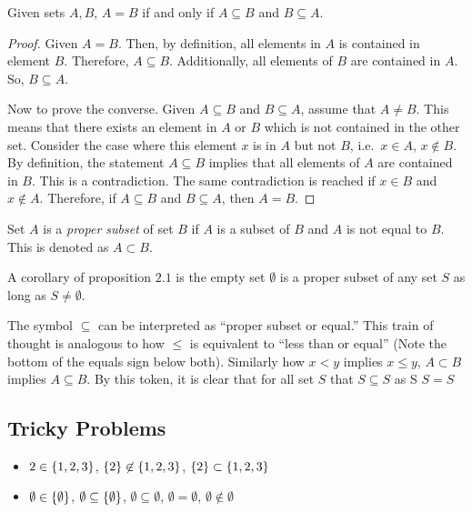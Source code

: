 \bigskip
\begin{proposition}
    Given sets \(A,B\), \(A=B\) if and only if \(A\subseteq B\) and \(B\subseteq A\).
\end{proposition}
\begin{proof}
    Given \(A=B\). Then, by definition, all elements in \(A\) is contained in element \(B\). Therefore, \(A\subseteq B\).
    Additionally, all elements of \(B\) are contained in \(A\). So, \(B\subseteq A\).

    Now to prove the converse. Given \(A\subseteq B\) and \(B\subseteq A\), assume that \(A\ne B\). This means that there exists an element
    in \(A\) or \(B\) which is not contained in the other set. Consider the case where this element \(x\) is in \(A\) but not \(B\), i.e.\
    \(x\in A\), \(x\not\in B\). By definition, the statement \(A\subseteq B\) implies that all elements of \(A\) are contained in \(B\). This
    is a contradiction. The same contradiction is reached if \(x\in B\) and \(x\not\in A\). Therefore, if \(A\subseteq B\) and \(B\subseteq A\),
    then \(A=B\).
\end{proof}

\bigskip

\begin{definition}
    Set \(A\) is a \emph{proper subset} of set \(B\) if \(A\) is a subset of \(B\) and \(A\) is not equal to \(B\). This is denoted as \(A\subset B\).
\end{definition}

A corollary of proposition \(2.1\) is the empty set \(\emptyset\) is a proper subset of any set \(S\) as long as \(S\ne\emptyset\).

The symbol \(\subseteq\) can be interpreted as “proper subset or equal.” This train of thought
is analogous to how \(\le\) is equivalent to ``less than or equal'' (Note the bottom
of the equals sign below both). Similarly how \(x<y\) implies \(x\le y\), \(A\subset B\)
implies \(A\subseteq B\). By this token, it is clear that for all set \(S\) that \(S\subseteq S\) as S \(S=S\)

\subsection*{Tricky Problems}

\begin{itemize}
    \item \(2\in\{1,2,3\}\), \(\{2\}\not\in\{1,2,3\}\), \(\{2\}\subset\{1,2,3\}\)
    \item \(\emptyset\in\{\emptyset\}\), \(\emptyset\subseteq\{\emptyset\}\), \(\emptyset\subseteq\emptyset\), \(\emptyset=\emptyset\), \(\emptyset\not\in\emptyset\)
\end{itemize}